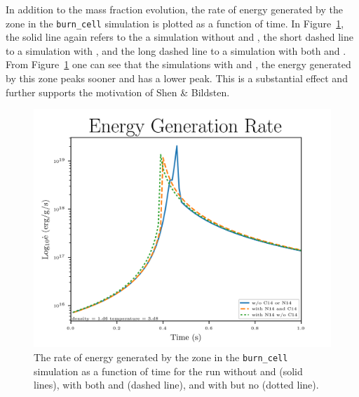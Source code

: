 \documentclass[11pt, oneside]{article}   	%
\begin{document}
      In addition to the mass fraction evolution, the rate of energy generated by the zone in the {\tt burn\_cell} simulation is plotted as a function of time. In Figure~\ref{fig:energygeneration}, the solid line again refers to the a simulation without  and , the short dashed line to a simulation with , and the long dashed line to a simulation with both  and . From Figure~\ref{fig:energygeneration} one can see that the simulations with  and , the energy generated by this zone peaks sooner and has a lower peak. This is a substantial effect and further supports the motivation of Shen \& Bildsten. %
      
      \begin{figure}
        \centering
        \includegraphics[width=5in]{images/subch_nC14nN14_edot_tol-10.png}
        \caption{The rate of energy generated by the zone in the {\tt burn\_cell} simulation as a function of time for the run without  and  (solid lines), with both  and  (dashed line), and with  but no  (dotted line).
          }
        \label{fig:energygeneration}
      \end{figure} 
  
\end{document}
